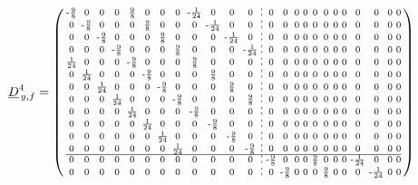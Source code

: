 \documentclass[pdftex,a4paper,parskip,listof=totoc,bibliography=totoc,onehalfspacing,12pt]{scrreprt}
\newcommand*\dashline{\hspace{-0.3em}\rotatebox[origin=c]{90}{\scalebox{-0.3}[1]{$-~~-$}}\hspace{-0.3em}}
\begin{document}
\begin{align*}
	\underline{D}_{\,y,f}^4 &= \begin{psmallmatrix}
\text{-}\frac{9}{8} & 0 & 0 & 0 & \frac{9}{8} & 0 & 0 & 0 & \text{-}\frac{1}{24} & 0 & 0 & 0 &\dashline& 0 & 0 & 0 & 0 & 0 & 0 & 0 & 0 & 0 & 0 & 0 & 0 \\
0 & \text{-}\frac{9}{8} & 0 & 0 & 0 & \frac{9}{8} & 0 & 0 & 0 & \text{-}\frac{1}{24} & 0 & 0 &\dashline& 0 & 0 & 0 & 0 & 0 & 0 & 0 & 0 & 0 & 0 & 0 & 0 \\
0 & 0 & \text{-}\frac{9}{8} & 0 & 0 & 0 & \frac{9}{8} & 0 & 0 & 0 & \text{-}\frac{1}{24} & 0 &\dashline& 0 & 0 & 0 & 0 & 0 & 0 & 0 & 0 & 0 & 0 & 0 & 0 \\
0 & 0 & 0 & \text{-}\frac{9}{8} & 0 & 0 & 0 & \frac{9}{8} & 0 & 0 & 0 & \text{-}\frac{1}{24} &\dashline& 0 & 0 & 0 & 0 & 0 & 0 & 0 & 0 & 0 & 0 & 0 & 0 \\
\frac{1}{24} & 0 & 0 & 0 & \text{-}\frac{9}{8} & 0 & 0 & 0 & \frac{9}{8} & 0 & 0 & 0 &\dashline& 0 & 0 & 0 & 0 & 0 & 0 & 0 & 0 & 0 & 0 & 0 & 0 \\
0 & \frac{1}{24} & 0 & 0 & 0 & \text{-}\frac{9}{8} & 0 & 0 & 0 & \frac{9}{8} & 0 & 0 &\dashline& 0 & 0 & 0 & 0 & 0 & 0 & 0 & 0 & 0 & 0 & 0 & 0 \\
0 & 0 & \frac{1}{24} & 0 & 0 & 0 & \text{-}\frac{9}{8} & 0 & 0 & 0 & \frac{9}{8} & 0 &\dashline& 0 & 0 & 0 & 0 & 0 & 0 & 0 & 0 & 0 & 0 & 0 & 0 \\
0 & 0 & 0 & \frac{1}{24} & 0 & 0 & 0 & \text{-}\frac{9}{8} & 0 & 0 & 0 & \frac{9}{8} &\dashline& 0 & 0 & 0 & 0 & 0 & 0 & 0 & 0 & 0 & 0 & 0 & 0 \\
0 & 0 & 0 & 0 & \frac{1}{24} & 0 & 0 & 0 & \text{-}\frac{9}{8} & 0 & 0 & 0 &\dashline& 0 & 0 & 0 & 0 & 0 & 0 & 0 & 0 & 0 & 0 & 0 & 0 \\
0 & 0 & 0 & 0 & 0 & \frac{1}{24} & 0 & 0 & 0 & \text{-}\frac{9}{8} & 0 & 0 &\dashline& 0 & 0 & 0 & 0 & 0 & 0 & 0 & 0 & 0 & 0 & 0 & 0 \\
0 & 0 & 0 & 0 & 0 & 0 & \frac{1}{24} & 0 & 0 & 0 & \text{-}\frac{9}{8} & 0 &\dashline& 0 & 0 & 0 & 0 & 0 & 0 & 0 & 0 & 0 & 0 & 0 & 0 \\
0 & 0 & 0 & 0 & 0 & 0 & 0 & \frac{1}{24} & 0 & 0 & 0 & \text{-}\frac{9}{8} &\dashline& 0 & 0 & 0 & 0 & 0 & 0 & 0 & 0 & 0 & 0 & 0 & 0 \\\hline
0 & 0 & 0 & 0 & 0 & 0 & 0 & 0 & 0 & 0 & 0 & 0 &\dashline& \text{-}\frac{9}{8} & 0 & 0 & 0 & \frac{9}{8} & 0 & 0 & 0 & \text{-}\frac{1}{24} & 0 & 0 & 0 \\
0 & 0 & 0 & 0 & 0 & 0 & 0 & 0 & 0 & 0 & 0 & 0 &\dashline& 0 & \text{-}\frac{9}{8} & 0 & 0 & 0 & \frac{9}{8} & 0 & 0 & 0 & \text{-}\frac{1}{24} & 0 & 0 \\

\end{psmallmatrix}
\end{align*}
\end{document}

